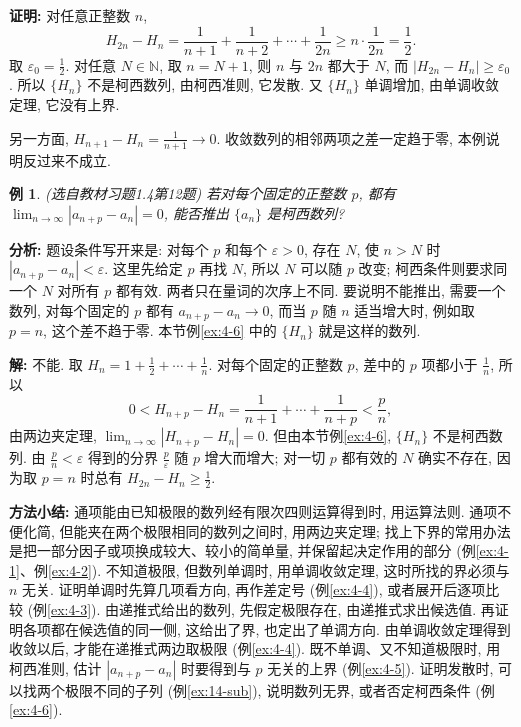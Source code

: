 \documentclass[UTF8,openany]{ctexbook}
\theoremstyle{chinesetextbook}
\newtheorem{example}{例}[section]
\newenvironment{cnproof}{\par\indent\textbf{证明:} \ignorespaces}{\par}
\newenvironment{cnsolution}{\par\indent\textbf{解:} \ignorespaces}{\par}
\begin{document}
\begin{cnproof}
对任意正整数 $n$,
\[
H_{2n}-H_n=\frac1{n+1}+\frac1{n+2}+\cdots+\frac1{2n}\ge n\cdot\frac1{2n}=\frac12.
\]
取 $\displaystyle\varepsilon_0=\frac12$. 对任意 $N\in\mathbb N$, 取 $n=N+1$, 则 $n$ 与 $2n$ 都大于 $N$, 而 $|H_{2n}-H_n|\ge\varepsilon_0$. 所以 $\{H_n\}$ 不是柯西数列, 由柯西准则, 它发散. 又 $\{H_n\}$ 单调增加, 由单调收敛定理, 它没有上界.

另一方面, $\displaystyle H_{n+1}-H_n=\frac1{n+1}\to0$. 收敛数列的相邻两项之差一定趋于零, 本例说明反过来不成立.
\end{cnproof}
\begin{example}
\textnormal{(选自教材习题1.4第12题)} 若对每个固定的正整数 $p$, 都有 $\displaystyle\lim_{n\to\infty}|a_{n+p}-a_n|=0$, 能否推出 $\{a_n\}$ 是柯西数列?
\end{example}
\par\indent\textbf{分析:} 题设条件写开来是: 对每个 $p$ 和每个 $\varepsilon>0$, 存在 $N$, 使 $n>N$ 时 $|a_{n+p}-a_n|<\varepsilon$. 这里先给定 $p$ 再找 $N$, 所以 $N$ 可以随 $p$ 改变; 柯西条件则要求同一个 $N$ 对所有 $p$ 都有效. 两者只在量词的次序上不同. 要说明不能推出, 需要一个数列, 对每个固定的 $p$ 都有 $a_{n+p}-a_n\to0$, 而当 $p$ 随 $n$ 适当增大时, 例如取 $p=n$, 这个差不趋于零. 本节例\ref{ex:4-6} 中的 $\{H_n\}$ 就是这样的数列.
\begin{cnsolution}
不能. 取 $\displaystyle H_n=1+\frac12+\cdots+\frac1n$. 对每个固定的正整数 $p$, 差中的 $p$ 项都小于 $\displaystyle\frac1n$, 所以
\[
0<H_{n+p}-H_n=\frac1{n+1}+\cdots+\frac1{n+p}<\frac pn,
\]
由两边夹定理, $\displaystyle\lim_{n\to\infty}|H_{n+p}-H_n|=0$. 但由本节例\ref{ex:4-6}, $\{H_n\}$ 不是柯西数列. 由 $\displaystyle\frac pn<\varepsilon$ 得到的分界 $\displaystyle\frac p\varepsilon$ 随 $p$ 增大而增大; 对一切 $p$ 都有效的 $N$ 确实不存在, 因为取 $p=n$ 时总有 $\displaystyle H_{2n}-H_n\ge\frac12$.
\end{cnsolution}
\par\indent\textbf{方法小结:} 通项能由已知极限的数列经有限次四则运算得到时, 用运算法则. 通项不便化简, 但能夹在两个极限相同的数列之间时, 用两边夹定理; 找上下界的常用办法是把一部分因子或项换成较大、较小的简单量, 并保留起决定作用的部分 (例\ref{ex:4-1}、例\ref{ex:4-2}). 不知道极限, 但数列单调时, 用单调收敛定理, 这时所找的界必须与 $n$ 无关. 证明单调时先算几项看方向, 再作差定号 (例\ref{ex:4-4}), 或者展开后逐项比较 (例\ref{ex:4-3}). 由递推式给出的数列, 先假定极限存在, 由递推式求出候选值. 再证明各项都在候选值的同一侧, 这给出了界, 也定出了单调方向. 由单调收敛定理得到收敛以后, 才能在递推式两边取极限 (例\ref{ex:4-4}). 既不单调、又不知道极限时, 用柯西准则, 估计 $|a_{n+p}-a_n|$ 时要得到与 $p$ 无关的上界 (例\ref{ex:4-5}). 证明发散时, 可以找两个极限不同的子列 (例\ref{ex:14-sub}), 说明数列无界, 或者否定柯西条件 (例\ref{ex:4-6}).
\end{document}
